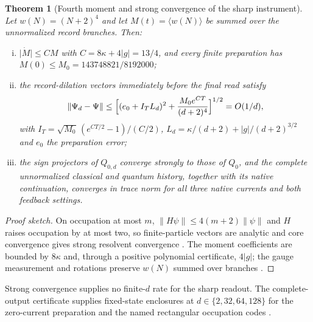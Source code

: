 \documentclass[11pt]{article}
\newtheorem{theorem}{Theorem}[section]
\theoremstyle{definition}
\theoremstyle{remark}
\theoremstyle{plain}
\begin{document}
\begin{theorem}[Fourth moment and strong convergence of the sharp instrument]
\label{thm:fourth}
Let $w(N)=(N+2)^4$ and let $M(t)=\langle w(N)\rangle$ be summed over the
unnormalized record branches. Then:
\begin{enumerate}[(i)]
\item $\lvert\dot M\rvert\le CM$ with $C=8\kappa+4\lvert g\rvert=13/4$, and
every finite preparation has $M(0)\le M_0=143748821/8192000$;
\item the record-dilation vectors immediately before the final read satisfy
\[
\lVert\Psi_d-\Psi\rVert\le\Bigl[(e_0+I_TL_d)^2+\frac{M_0e^{CT}}{(d+2)^4}\Bigr]^{1/2}=O(1/d),
\]
with $I_T=\sqrt{M_0}\,(e^{CT/2}-1)/(C/2)$,
$L_d=\kappa/(d+2)+\lvert g\rvert/(d+2)^{3/2}$ and $e_0$ the preparation
error;
\item the sign projectors of $Q_{0,d}$ converge strongly to those of $Q_0$,
and the complete unnormalized classical and quantum history, together with
its native continuation, converges in trace norm for all three native
currents and both feedback settings.
\end{enumerate}
\end{theorem}

\begin{proof}[Proof sketch]
On occupation at most $m$, $\lVert H\psi\rVert\le4(m+2)\lVert\psi\rVert$ and
$H$ raises occupation by at most two, so finite-particle vectors are analytic
and core convergence gives strong resolvent convergence
\cite{reedsimon2,teschl2014}. The moment coefficients are bounded by $8\kappa$
and, through a positive polynomial certificate, $4\lvert g\rvert$; the
gauge measurement and rotations preserve $w(N)$ summed over branches
\cite{csOCCREF}.
\end{proof}

Strong convergence supplies no finite-$d$ rate for the sharp readout. The
complete-output certificate supplies fixed-state enclosures at
$d\in\{2,32,64,128\}$ for the zero-current preparation and the named
rectangular occupation codes \cite{csREAD,rSHARP}.
\end{document}
